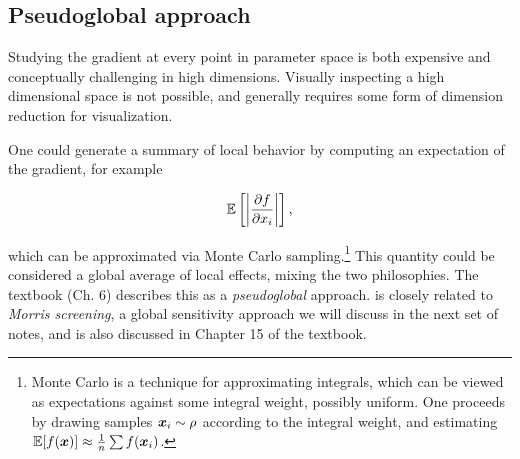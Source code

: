 \documentclass[../primer.tex]{subfiles}
\begin{document}
\subsection{Pseudoglobal approach}
\label{sec:orge4ebe04}
Studying the gradient at every point in parameter space is both expensive and
conceptually challenging in high dimensions. Visually inspecting a high
dimensional space is not possible, and generally requires some form of dimension
reduction for visualization.

One could generate a summary of local behavior by computing an expectation of
the gradient, for example

\begin{equation}\label{eq:grad-avg}
  \mathbb{E}\left[\left|\frac{\partial f}{\partial x_i}\right|\right],
\end{equation}

\noindent which can be approximated via Monte Carlo sampling.\footnote{Monte Carlo is
a technique for approximating integrals, which can be viewed as expectations
against some integral weight, possibly uniform. One proceeds by drawing samples
\(\boldsymbol{x}_i\sim\rho\) according to the integral weight, and estimating
\(\mathbb{E}[f(\boldsymbol{x})]\approx\frac{1}{n}\sum f(\boldsymbol{x}_i)\).} This quantity could be considered
a global average of local effects, mixing the two philosophies. The textbook
(Ch. 6) describes this as a \emph{pseudoglobal} approach.  is
closely related to \emph{Morris screening}, a global sensitivity approach we will
discuss in the next set of notes, and is also discussed in Chapter 15 of the
textbook.\cite{smith2013uncertainty}

\end{document}
